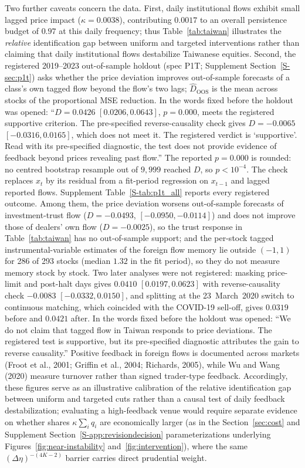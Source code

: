 \documentclass[11pt,letterpaper]{article}
\theoremstyle{definition}
\begin{document}
Two further caveats concern the data. First, daily institutional flows exhibit small lagged price impact ($\kappa = 0.0038$), contributing $0.0017$ to an overall persistence budget of $0.97$ at this daily frequency; thus Table~\ref{tab:taiwan} illustrates the \emph{relative} identification gap between uniform and targeted interventions rather than claiming that daily institutional flows destabilize Taiwanese equities. Second, the registered 2019--2023 out-of-sample holdout (spec P1T; Supplement Section~\ref{S-sec:p1t}) asks whether the price deviation improves out-of-sample forecasts of a class's own tagged flow beyond the flow's two lags; $\hat D_{\mathrm{OOS}}$ is the mean across stocks of the proportional MSE reduction. In the words fixed before the holdout was opened: ``$D = 0.0426$ $[0.0206, 0.0643]$, $p = 0.000$, meets the registered supportive criterion. The pre-specified reverse-causality check gives $D = -0.0065$ $[-0.0316, 0.0165]$, which does not meet it. The registered verdict is `supportive'. Read with its pre-specified diagnostic, the test does not provide evidence of feedback beyond prices revealing past flow.'' The reported $p = 0.000$ is rounded: no centred bootstrap resample out of $9{,}999$ reached $D$, so $p < 10^{-4}$. The check replaces $x_t$ by its residual from a fit-period regression on $x_{t-1}$ and lagged reported flows. Supplement Table~\ref{S-tab:p1t_all} reports every registered outcome. Among them, the price deviation worsens out-of-sample forecasts of investment-trust flow ($D = -0.0493$, $[-0.0950, -0.0114]$) and does not improve those of dealers' own flow ($D = -0.0025$), so the trust response in Table~\ref{tab:taiwan} has no out-of-sample support; and the per-stock tagged instrumental-variable estimates of the foreign flow memory lie outside $(-1, 1)$ for 286 of 293 stocks (median $1.32$ in the fit period), so they do not measure memory stock by stock. Two later analyses were not registered: masking price-limit and post-halt days gives $0.0410$ $[0.0197, 0.0623]$ with reverse-causality check $-0.0083$ $[-0.0332, 0.0150]$, and splitting at the 23~March~2020 switch to continuous matching, which coincided with the COVID-19 sell-off, gives $0.0319$ before and $0.0421$ after. In the words fixed before the holdout was opened: ``We do not claim that tagged flow in Taiwan responds to price deviations. The registered test is supportive, but its pre-specified diagnostic attributes the gain to reverse causality.'' Positive feedback in foreign flows is documented across markets (Froot et al., 2001; Griffin et al., 2004; Richards, 2005), while Wu and Wang (2020) measure turnover rather than signed trader-type feedback. Accordingly, these figures serve as an illustrative calibration of the relative identification gap between uniform and targeted cuts rather than a causal test of daily feedback destabilization; evaluating a high-feedback venue would require separate evidence on whether shares $\kappa\sum_i q_i$ are economically larger (as in the Section~\ref{sec:cost} and Supplement Section~\ref{S-app:revisiondecision} parameterizations underlying Figures~\ref{fig:near-instability} and~\ref{fig:intervention}), where the same $(\Delta\eta)^{-(4K-2)}$ barrier carries direct prudential weight.
\end{document}
